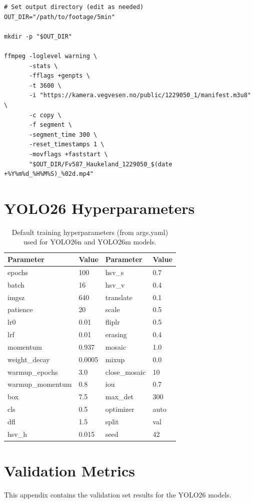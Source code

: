 \begin{verbatim}
# Set output directory (edit as needed)
OUT_DIR="/path/to/footage/5min"

mkdir -p "$OUT_DIR"

ffmpeg -loglevel warning \
       -stats \
       -fflags +genpts \
       -t 3600 \
       -i "https://kamera.vegvesen.no/public/1229050_1/manifest.m3u8" \
       -c copy \
       -f segment \
       -segment_time 300 \
       -reset_timestamps 1 \
       -movflags +faststart \
       "$OUT_DIR/Fv587_Haukeland_1229050_$(date +%Y%m%d_%H%M%S)_%02d.mp4"
\end{verbatim}


\chapter{YOLO26 Hyperparameters}
\label{app:hyperparameters}

\begin{table}[H]
\caption{Default training hyperparameters (from args.yaml) used for YOLO26n and YOLO26m models.}
\centering
\small
\begin{tabular}{ll|ll}
\hline
Parameter & Value & Parameter & Value \\
\hline
epochs & 100 & hsv\_s & 0.7 \\
batch & 16 & hsv\_v & 0.4 \\
imgsz & 640 & translate & 0.1 \\
patience & 20 & scale & 0.5 \\
lr0 & 0.01 & fliplr & 0.5 \\
lrf & 0.01 & erasing & 0.4 \\
momentum & 0.937 & mosaic & 1.0 \\
weight\_decay & 0.0005 & mixup & 0.0 \\
warmup\_epochs & 3.0 & close\_mosaic & 10 \\
warmup\_momentum & 0.8 & iou & 0.7 \\
box & 7.5 & max\_det & 300 \\
cls & 0.5 & optimizer & auto \\
dfl & 1.5 & split & val \\
hsv\_h & 0.015 & seed & 42 \\
\hline
\end{tabular}
\label{tab:yolo_hyperparameters}
\end{table}


\chapter{Validation Metrics}
\label{app:val_metrics}
This appendix contains the validation set results for the YOLO26 models.

